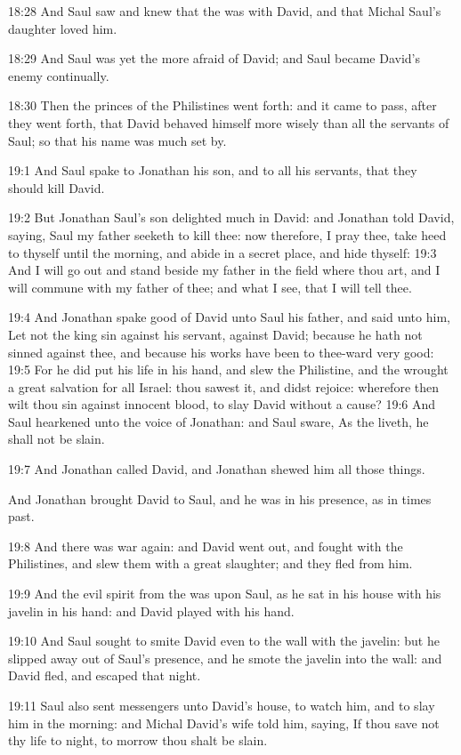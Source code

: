 18:28 And Saul saw and knew that the \LORD was with David, and that
Michal Saul's daughter loved him.

18:29 And Saul was yet the more afraid of David; and Saul became
David's enemy continually.

18:30 Then the princes of the Philistines went forth: and it came to
pass, after they went forth, that David behaved himself more wisely
than all the servants of Saul; so that his name was much set by.

19:1 And Saul spake to Jonathan his son, and to all his servants, that
they should kill David.

19:2 But Jonathan Saul's son delighted much in David: and Jonathan
told David, saying, Saul my father seeketh to kill thee: now
therefore, I pray thee, take heed to thyself until the morning, and
abide in a secret place, and hide thyself: 19:3 And I will go out and
stand beside my father in the field where thou art, and I will commune
with my father of thee; and what I see, that I will tell thee.

19:4 And Jonathan spake good of David unto Saul his father, and said
unto him, Let not the king sin against his servant, against David;
because he hath not sinned against thee, and because his works have
been to thee-ward very good: 19:5 For he did put his life in his hand,
and slew the Philistine, and the \LORD wrought a great salvation for
all Israel: thou sawest it, and didst rejoice: wherefore then wilt
thou sin against innocent blood, to slay David without a cause?  19:6
And Saul hearkened unto the voice of Jonathan: and Saul sware, As the
\LORD liveth, he shall not be slain.

19:7 And Jonathan called David, and Jonathan shewed him all those
things.

And Jonathan brought David to Saul, and he was in his presence, as in
times past.

19:8 And there was war again: and David went out, and fought with the
Philistines, and slew them with a great slaughter; and they fled from
him.

19:9 And the evil spirit from the \LORD was upon Saul, as he sat in his
house with his javelin in his hand: and David played with his hand.

19:10 And Saul sought to smite David even to the wall with the
javelin: but he slipped away out of Saul's presence, and he smote the
javelin into the wall: and David fled, and escaped that night.

19:11 Saul also sent messengers unto David's house, to watch him, and
to slay him in the morning: and Michal David's wife told him, saying,
If thou save not thy life to night, to morrow thou shalt be slain.

